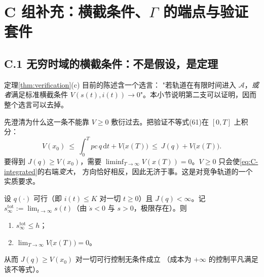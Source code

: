 
\section*{C 组补充：横截条件、$\Gamma$ 的端点与验证套件}

\subsection*{C.1 无穷时域的横截条件：不是假设，是定理}

定理\ref{thm:verification}(c) 目前的陈述含一个选言：
"若轨道在有限时间进入 $\mathcal{A}$，\emph{或者}满足标准横截条件
$V(s(t),i(t))\to0$"。本小节说明第二支可以证明，因而整个选言可以去掉。

先澄清为什么这一条不能靠 $V\ge0$ 敷衍过去。把验证不等式(61)在 $[0,T]$ 上积分：
\begin{equation}
  V(x_0)\ \le\ \int_0^{T}pc\,q\,\mathrm{d}t+V\bigl(x(T)\bigr)
  \ \le\ J(q)+V\bigl(x(T)\bigr).
  \label{eq:C-integrated}
\end{equation}
要得到 $J(q)\ge V(x_0)$，需要
$\liminf_{T\to\infty}V(x(T))=0$。$V\ge0$ 只会使\eqref{eq:C-integrated}的右端\emph{变大}，
方向恰好相反，因此无济于事。这是对竞争轨道的一个实质要求。

\begin{lemma}[有限成本可行轨道必趋于安全集]
\label{lem:transversality}
设 $q(\cdot)$ 可行（即 $i(t)\le K$ 对一切 $t\ge0$）且 $J(q)<\infty$。记
$s_\infty^{\mathrm{tot}}:=\lim_{t\to\infty}s(t)$（由 $\dot s<0$ 与 $s>0$，极限存在）。则
\begin{enumerate}
\item[(i)] $s_\infty^{\mathrm{tot}}\le h$；
\item[(ii)] $\lim_{T\to\infty}V\bigl(x(T)\bigr)=0$。
\end{enumerate}
从而 $J(q)\ge V(x_0)$ 对一切可行控制无条件成立
（成本为 $+\infty$ 的控制平凡满足该不等式）。
\end{lemma}

